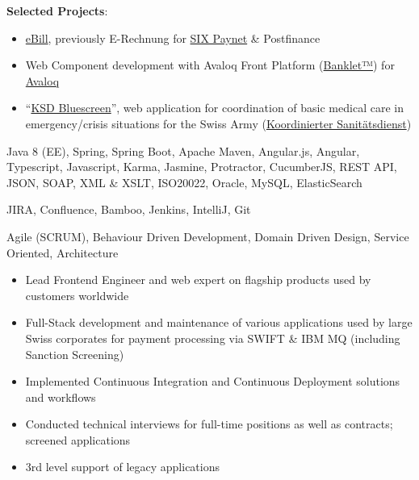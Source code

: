 \smallskip
\textbf{Selected Projects}:
\smallskip
\begin{itemize}
	\item \href{https://www.ebill.ch/}{eBill}, previously E-Rechnung for \href{https://www.six-group.com/en/site/banking-services/paynet.html}{SIX Paynet} \& Postfinance
	\item Web Component development with Avaloq Front Platform (\href{https://developer.avaloq.com/web/developer-portal/learn}{Banklet™}) for \href{https://www.avaloq.com/en/}{Avaloq}
	\item \enquote{\href{https://blog.alertswiss.ch/de/rubriken/bevoelkerungsschutz/koordinierter-sanitaetsdienst-ksd-neues-management-tool-blue-screen-switzerland/}{KSD Bluescreen}}, web application for coordination of basic medical care in emergency/crisis situations for the Swiss Army (\href{https://www.vtg.admin.ch/de/organisation/astab/san/ksd.html}{Koordinierter Sanitätsdienst})
\end{itemize}

\medskip
\begin{description}
	\ifincludestech
	\item [Technologies:] Java 8 (EE), Spring, Spring Boot, Apache Maven, Angular.js, Angular, Typescript, Javascript, Karma, Jasmine, Protractor, CucumberJS, REST API, JSON, SOAP, XML \& XSLT, ISO20022, Oracle, MySQL, ElasticSearch
	\fi
	\ifincludestools
	\item [Tools:] JIRA, Confluence, Bamboo, Jenkins, IntelliJ, Git
	\fi
	\ifincludesmethods
	\item [Methodologies:] Agile (SCRUM), Behaviour Driven Development, Domain Driven Design, Service Oriented, Architecture
	\fi
\end{description}

\divider


\begin{itemize}
	\item Lead Frontend Engineer and web expert on flagship products used by customers worldwide
	\item Full-Stack development and maintenance of various applications used by large Swiss corporates for payment processing via SWIFT \& IBM MQ (including Sanction Screening)
	\item Implemented Continuous Integration and Continuous Deployment solutions and workflows 
	\item Conducted technical interviews for full-time positions as well as contracts; screened applications
	\item 3rd level support of legacy applications
\end{itemize}

